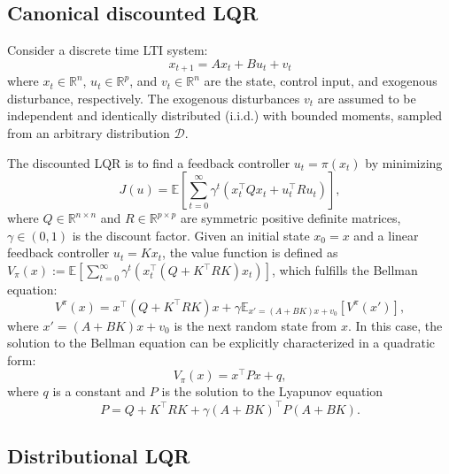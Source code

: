 \documentclass[letterpaper, 10 pt, conference]{ieeeconf}  %
\begin{document}
\subsection{Canonical discounted LQR}
Consider a discrete time LTI system:
\begin{equation*}
    x_{t+1}=Ax_{t}+Bu_{t}+v_t
\end{equation*}
where  \( x_t \in \mathbb{R}^n \), \( u_t \in \mathbb{R}^p \), and \( v_t \in \mathbb{R}^n \) are the state, control input, and exogenous disturbance, respectively. The exogenous disturbances \( v_t \) are assumed to be independent and identically distributed (i.i.d.) with bounded moments, sampled from an arbitrary distribution \( \mathcal{D} \). %

The discounted LQR is to find a feedback controller  $u_t=\pi(x_t)$ by minimizing
\begin{equation}
J(u) = \mathbb{E} \left[ \sum_{t=0}^{\infty} \gamma^t \left( x_t^\top Q x_t + u_t^\top R u_t \right) \right],
\end{equation}
where \( Q \in \mathbb{R}^{n \times n} \) and \( R  \in \mathbb{R}^{p \times p} \) are symmetric positive definite matrices, \( \gamma \in (0,1) \) is the discount factor. Given an initial state $x_0=x$ and a linear feedback controller  $u_t=K x_t$, the value function is defined as $V_{\pi} (x):=\mathbb{E} \left[ \sum_{t=0}^{\infty} \gamma^t \left( x_t^\top (Q+K^\top R K) x_t\right) \right]$, which fulfills the Bellman equation:
\begin{equation}
V^\pi(x) = x^\top (Q + K^\top R K) x + \gamma \mathbb{E}_{x' = (A + B K)x + v_0} \left[ V^\pi(x') \right],
\end{equation}
where $x'=(A+BK)x+v_0$ is the next random state from $x$. In this case, the solution to the Bellman equation can be explicitly characterized in a quadratic form: 
\begin{equation*}
    V_{\pi}(x)=x^\top P x+ q,
\end{equation*}
where $q$ is a constant and $P$ is the solution to the Lyapunov equation 
\begin{equation}\label{Eq:Lyapunov}
P=Q+K^\top R K+\gamma(A+BK)^\top P(A+BK).
\end{equation}

\subsection{Distributional LQR}
\end{document}
